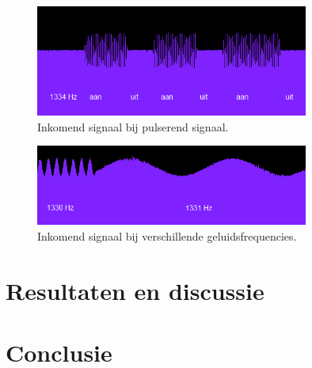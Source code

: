 \documentclass[a4paper,10pt]{article}
\begin{document}
\begin{figure}[ht!]
    \centering
    \includegraphics[width=0.8\textwidth]{resonance_on_off_commit_ff82f.png}
    \caption{Inkomend signaal bij pulserend signaal.}
    \label{fig:on_off}
\end{figure}

\begin{figure}[ht!]
    \centering
    \includegraphics[width=0.8\textwidth]{resonance_2_frequencies_commit_ff82f.png}
    \caption{Inkomend signaal bij verschillende geluidsfrequencies.}
    \label{fig:resonance}
\end{figure}

\section{Resultaten en discussie}\label{sec:resultaten}

\section{Conclusie}\label{sec:conclusie}

% 



\end{document}
